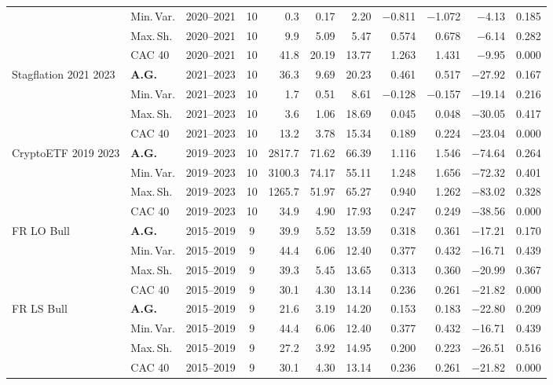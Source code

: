 \begin{longtable}{p{2.6cm} l c c r r r r r r r}
 & Min.\,Var. & 2020--2021 & 10 & 0.3 & 0.17 & 2.20 & $-$0.811 & $-$1.072 & $-$4.13 & 0.185 \\
 & Max.\,Sh. & 2020--2021 & 10 & 9.9 & 5.09 & 5.47 & 0.574 & 0.678 & $-$6.14 & 0.282 \\
 & CAC 40 & 2020--2021 & 10 & 41.8 & 20.19 & 13.77 & 1.263 & 1.431 & $-$9.95 & 0.000 \\
\midrule
Stagflation 2021 2023 & \textbf{A.G.} & 2021--2023 & 10 & 36.3 & 9.69 & 20.23 & 0.461 & 0.517 & $-$27.92 & 0.167 \\
 & Min.\,Var. & 2021--2023 & 10 & 1.7 & 0.51 & 8.61 & $-$0.128 & $-$0.157 & $-$19.14 & 0.216 \\
 & Max.\,Sh. & 2021--2023 & 10 & 3.6 & 1.06 & 18.69 & 0.045 & 0.048 & $-$30.05 & 0.417 \\
 & CAC 40 & 2021--2023 & 10 & 13.2 & 3.78 & 15.34 & 0.189 & 0.224 & $-$23.04 & 0.000 \\
\midrule
CryptoETF 2019 2023 & \textbf{A.G.} & 2019--2023 & 10 & 2817.7 & 71.62 & 66.39 & 1.116 & 1.546 & $-$74.64 & 0.264 \\
 & Min.\,Var. & 2019--2023 & 10 & 3100.3 & 74.17 & 55.11 & 1.248 & 1.656 & $-$72.32 & 0.401 \\
 & Max.\,Sh. & 2019--2023 & 10 & 1265.7 & 51.97 & 65.27 & 0.940 & 1.262 & $-$83.02 & 0.328 \\
 & CAC 40 & 2019--2023 & 10 & 34.9 & 4.90 & 17.93 & 0.247 & 0.249 & $-$38.56 & 0.000 \\
\midrule
FR LO Bull & \textbf{A.G.} & 2015--2019 & 9 & 39.9 & 5.52 & 13.59 & 0.318 & 0.361 & $-$17.21 & 0.170 \\
 & Min.\,Var. & 2015--2019 & 9 & 44.4 & 6.06 & 12.40 & 0.377 & 0.432 & $-$16.71 & 0.439 \\
 & Max.\,Sh. & 2015--2019 & 9 & 39.3 & 5.45 & 13.65 & 0.313 & 0.360 & $-$20.99 & 0.367 \\
 & CAC 40 & 2015--2019 & 9 & 30.1 & 4.30 & 13.14 & 0.236 & 0.261 & $-$21.82 & 0.000 \\
\midrule
FR LS Bull & \textbf{A.G.} & 2015--2019 & 9 & 21.6 & 3.19 & 14.20 & 0.153 & 0.183 & $-$22.80 & 0.209 \\
 & Min.\,Var. & 2015--2019 & 9 & 44.4 & 6.06 & 12.40 & 0.377 & 0.432 & $-$16.71 & 0.439 \\
 & Max.\,Sh. & 2015--2019 & 9 & 27.2 & 3.92 & 14.95 & 0.200 & 0.223 & $-$26.51 & 0.516 \\
 & CAC 40 & 2015--2019 & 9 & 30.1 & 4.30 & 13.14 & 0.236 & 0.261 & $-$21.82 & 0.000 \\
\midrule

\end{longtable}
